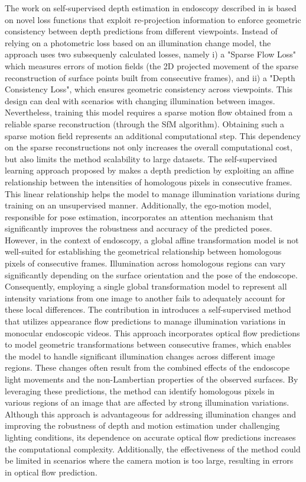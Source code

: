 \documentclass[a4paper,fleqn]{cas-dc}
\begin{document}
The work on self-supervised depth estimation in endoscopy described in \citep{Liu_IEEETMI_2019} is based on novel loss functions that exploit re-projection information to enforce geometric consistency between depth predictions from different viewpoints.  
Instead of relying on a photometric loss based on an illumination change model, the approach uses two subsequenly calculated losses, namely i) a "Sparse Flow Loss" which measures errors of motion fields (the 2D projected movement of the sparse reconstruction of surface points built from consecutive frames), and ii) a "Depth Consistency Loss", which ensures geometric consistency across viewpoints. This design can deal with scenarios with changing illumination between images.
%
Nevertheless, training this model requires a sparse motion flow obtained from a reliable sparse reconstruction (through the SfM algorithm). Obtaining such a sparse motion field represents an additional computational step. This dependency on the sparse reconstructions not only increases the overall computational cost, but also limits the method scalability to large datasets.
%
The self-supervised learning approach proposed by \citep{Ozyoruk_MIA_2021} makes a depth prediction by exploiting an affine relationship between the intensities of homologous pixels in consecutive frames. This linear relationship helps the model to manage illumination variations during training on an unsupervised manner. Additionally, the ego-motion model, responsible for pose estimation, incorporates an attention mechanism that significantly improves the robustness and accuracy of the predicted poses.
%
However, in the context of endoscopy, a global affine transformation model is not well-suited for establishing the geometrical relationship between homologous pixels of consecutive frames. Illumination across homologous regions can vary significantly depending on the surface orientation and the pose of the endoscope. Consequently, employing a single global transformation model to represent all intensity variations from one image to another fails to adequately account for these local differences.
%
The contribution in \citep{Shao_MIA_2022} introduces a self-supervised method that utilizes appearance flow predictions to manage illumination variations in monocular endoscopic videos. This approach incorporates optical flow predictions to model geometric transformations between consecutive frames, which enables the model to handle significant illumination changes across different image regions. These changes often result from the combined effects of the endoscope light movements and the non-Lambertian properties of the observed surfaces. By leveraging these predictions, the method can identify homologous pixels in various regions of an image that are affected by strong illumination variations.
%
Although this approach is advantageous for addressing illumination changes and improving the robustness of depth and motion estimation under challenging lighting conditions, its dependence on accurate optical flow predictions increases the computational complexity. Additionally, the effectiveness of the method could be limited in scenarios where the camera motion is too large, resulting in errors in optical flow prediction.
\end{document}
